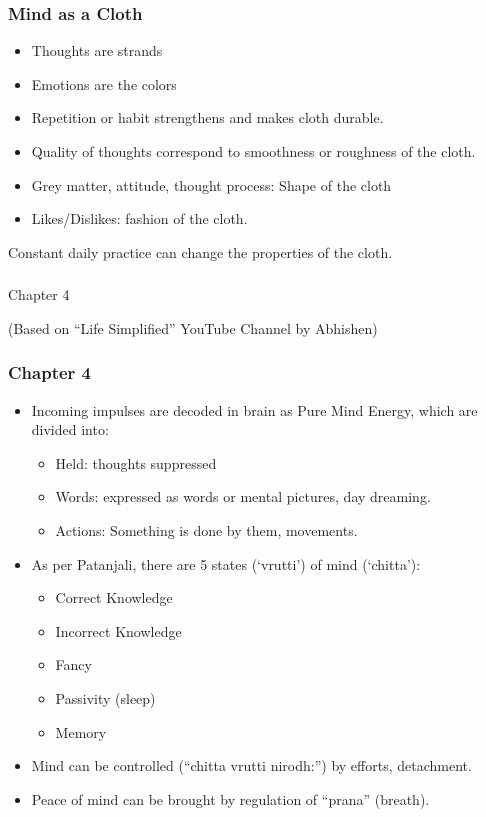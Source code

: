 \begin{frame}[fragile]
\frametitle{Mind as a Cloth}
\begin{itemize}
\item Thoughts are strands
\item Emotions are the colors
\item Repetition or habit strengthens and makes cloth durable.
\item Quality of thoughts correspond to smoothness or roughness of the cloth.
\item Grey matter, attitude, thought process: Shape of the cloth
\item Likes/Dislikes: fashion of the cloth.
\end{itemize}

Constant daily practice can change the properties of the cloth.
\end{frame}


\begin{frame}[fragile]\frametitle{}
\begin{center}
{\Large Chapter 4}

{\tiny (Based on ``Life Simplified'' YouTube Channel by Abhishen)}

\end{center}
\end{frame}

\begin{frame}[fragile]
\frametitle{Chapter 4}
\begin{itemize}
\item Incoming impulses are decoded in brain as Pure Mind Energy, which are divided into:

\begin{itemize}
\item Held: thoughts suppressed
\item Words: expressed as words or mental pictures, day dreaming.
\item Actions: Something is done by them, movements.
\end{itemize}
\item As per Patanjali, there are 5 states (`vrutti') of mind (`chitta'):
\begin{itemize}
\item Correct Knowledge
\item Incorrect Knowledge
\item Fancy
\item Passivity (sleep)
\item Memory
\end{itemize}
\item Mind can be controlled (``chitta vrutti nirodh:'') by efforts, detachment.
\item Peace of mind can be brought by regulation of ``prana'' (breath).
\end{itemize}

\end{frame}

